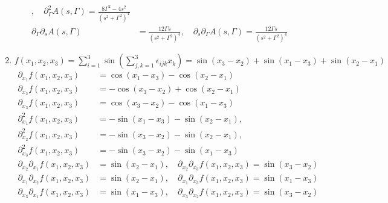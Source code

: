 \documentclass[11pt,answers]{exam}
\begin{document}
\begin{questions}
\begin{solution}
\begin{enumerate}
\begin{align*}
	,\quad
	\partial_\Gamma ^2A(s,\Gamma)=\frac{8\Gamma^2-4s^2}{(s^2+\Gamma^2)^4}
	\\
	\partial_\Gamma \partial_sA(s,\Gamma)&=\frac{12\Gamma s}{(s^2+\Gamma^2)^4}
	,\quad
	\partial_s\partial_\Gamma A(s,\Gamma)=\frac{12\Gamma s}{(s^2+\Gamma^2)^4}
\end{align*}
\item $f({x_1},{x_2},{x_3})=\sum_{i=1}^3\sin\left(\sum_{j,k=1}^3\epsilon_{ijk}x_k\right)=\sin(x_3-x_2)+\sin(x_1-x_3)+\sin(x_2-x_1)$
\begin{align*}
	\partial_{x_1}f(x_1,x_2,x_3)&=\cos(x_1-x_3)-\cos(x_2-x_1)
	\\
	\partial_{x_2}f(x_1,x_2,x_3)&=-\cos(x_3-x_2)+\cos(x_2-x_1)
	\\
	\partial_{x_3}f(x_1,x_2,x_3)&=\cos(x_3-x_2)-\cos(x_1-x_3)
	\\
	\partial_{x_1}^2f(x_1,x_2,x_3)&=-\sin(x_1-x_3)-\sin(x_2-x_1), \\ \partial_{x_2}^2f(x_1,x_2,x_3)&=-\sin(x_3-x_2)-\sin(x_2-x_1),\\ \partial_{x_3}^2f(x_1,x_2,x_3)&=-\sin(x_3-x_2)-\sin(x_1-x_3)
	\\
	\partial_{x_2}\partial_{x_1}f(x_1,x_2,x_3)&=\sin(x_2-x_1)
	,\quad
	\partial_{x_2}\partial_{x_3}f(x_1,x_2,x_3)=\sin(x_3-x_2)
	\\
	\partial_{x_1}\partial_{x_2}f(x_1,x_2,x_3)&=\sin(x_2-x_1)
	,\quad
	\partial_{x_1}\partial_{x_3}f(x_1,x_2,x_3)=\sin(x_1-x_3)
	\\
	\partial_{x_3}\partial_{x_1}f(x_1,x_2,x_3)&=\sin(x_1-x_3)
	,\quad
	\partial_{x_3}\partial_{x_2}f(x_1,x_2,x_3)=\sin(x_3-x_2)
\end{align*}

\end{enumerate}
\end{solution}





\end{questions}
\end{document}
